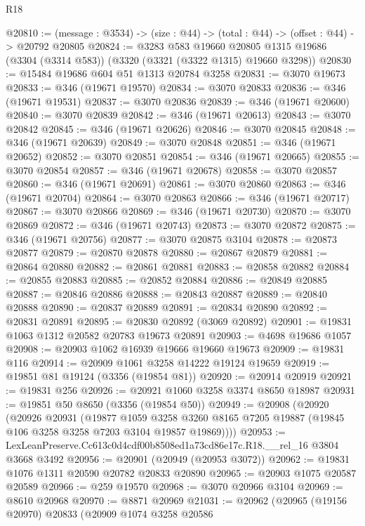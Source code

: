 \begin{lexlean}{R18}
\begin{coremodule}
@20810 := (message : @3534) -> (size : @44) -> (total : @44) -> (offset : @44) -> @20792 @20805
@20824 := @3283
    @583
    @19660
    @20805
    @1315
    @19686
    (@3304 (@3314 @583))
    (@3320 (@3321 (@3322 @1315) @19660 @3298))
@20830 := @15484 @19686 @604 @51 @1313 @20784 @3258
@20831 := @3070 @19673
@20833 := @346 (@19671 @19570)
@20834 := @3070 @20833
@20836 := @346 (@19671 @19531)
@20837 := @3070 @20836
@20839 := @346 (@19671 @20600)
@20840 := @3070 @20839
@20842 := @346 (@19671 @20613)
@20843 := @3070 @20842
@20845 := @346 (@19671 @20626)
@20846 := @3070 @20845
@20848 := @346 (@19671 @20639)
@20849 := @3070 @20848
@20851 := @346 (@19671 @20652)
@20852 := @3070 @20851
@20854 := @346 (@19671 @20665)
@20855 := @3070 @20854
@20857 := @346 (@19671 @20678)
@20858 := @3070 @20857
@20860 := @346 (@19671 @20691)
@20861 := @3070 @20860
@20863 := @346 (@19671 @20704)
@20864 := @3070 @20863
@20866 := @346 (@19671 @20717)
@20867 := @3070 @20866
@20869 := @346 (@19671 @20730)
@20870 := @3070 @20869
@20872 := @346 (@19671 @20743)
@20873 := @3070 @20872
@20875 := @346 (@19671 @20756)
@20877 := @3070 @20875 @3104
@20878 := @20873 @20877
@20879 := @20870 @20878
@20880 := @20867 @20879
@20881 := @20864 @20880
@20882 := @20861 @20881
@20883 := @20858 @20882
@20884 := @20855 @20883
@20885 := @20852 @20884
@20886 := @20849 @20885
@20887 := @20846 @20886
@20888 := @20843 @20887
@20889 := @20840 @20888
@20890 := @20837 @20889
@20891 := @20834 @20890
@20892 := @20831 @20891
@20895 := @20830 @20892 (@3069 @20892)
@20901 := @19831 @1063 @1312 @20582 @20783 @19673 @20891
@20903 := @4698 @19686 @1057
@20908 := @20903 @1062 @16939 @19666 @19660 @19673
@20909 := @19831 @116
@20914 := @20909 @1061 @3258 @14222 @19124 @19659
@20919 := @19851 @81 @19124 (@3356 (@19854 @81))
@20920 := @20914 @20919
@20921 := @19831 @256
@20926 := @20921 @1060 @3258 @3374 @8650 @18987
@20931 := @19851 @50 @8650 (@3356 (@19854 @50))
@20949 := @20908
    (@20920
      (@20926
        @20931
        (@19877
          @1059
          @3258
          @3260
          @8165
          @7205
          @19887
          (@19845 @106 @3258 @3258 @7203 @3104 @19857 @19869))))
@20953 := LexLeanPreserve.Cc613c0d4cdf00b8508ed1a73cd86e17c.R18.__rel_16 @3804 @3668 @3492
@20956 := @20901 (@20949 (@20953 @3072))
@20962 := @19831 @1076 @1311 @20590 @20782 @20833 @20890
@20965 := @20903 @1075 @20587 @20589
@20966 := @259 @19570
@20968 := @3070 @20966 @3104
@20969 := @8610 @20968
@20970 := @8871 @20969
@21031 := @20962
    (@20965
      (@19156 @20970)
      @20833
      (@20909
        @1074
        @3258
        @20586

\end{coremodule}
\end{lexlean}
